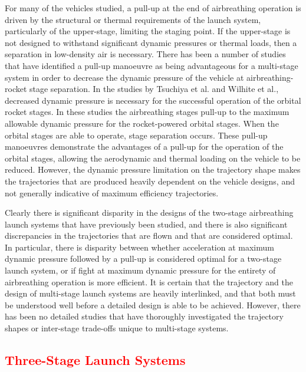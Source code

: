 For many of the vehicles studied, a pull-up at the end of airbreathing operation is driven by the structural or thermal requirements of the launch system, particularly of the upper-stage, limiting the staging point. If the upper-stage is not designed to withstand significant dynamic pressures or thermal loads, then a separation in low-density air is necessary. 
There has been a number of studies that have identified a pull-up manoeuvre as being advantageous for a multi-stage system in order to decrease the dynamic pressure of the vehicle at airbreathing-rocket stage separation\cite{Tsuchiya2005,Wilhite1991,Mehta2001,XXX}. 
In the studies by Tsuchiya et al.\cite{Tsuchiya2005} and Wilhite et al.\cite{Wilhite1991}, decreased dynamic pressure is necessary for the successful operation of the orbital rocket stages. In these studies the airbreathing stages pull-up to the maximum allowable dynamic pressure for the rocket-powered orbital stages. When the orbital stages are able to operate, stage separation occurs. These pull-up manoeuvres demonstrate the advantages of a pull-up for the operation of the orbital stages, allowing the aerodynamic and thermal loading on the vehicle to be reduced. However, the dynamic pressure limitation on the trajectory shape makes the trajectories that are produced heavily dependent on the vehicle designs, and not generally indicative of maximum efficiency trajectories. 



Clearly there is significant disparity in the designs of the two-stage airbreathing launch systems that have previously been studied, and there is also significant discrepancies in the trajectories that are flown and that are considered optimal.
In particular, there is disparity between whether acceleration at maximum dynamic pressure followed by a pull-up is considered optimal for a two-stage launch system, or if fight at maximum dynamic pressure for the entirety of airbreathing operation is more efficient.
It is certain that the trajectory and the design of multi-stage launch systems are heavily interlinked, and that both must be understood well before a detailed design is able to be achieved. However, there has been no detailed studies that have thoroughly investigated the trajectory shapes or inter-stage trade-offs unique to multi-stage systems. 



  \textcolor{red}{
  \subsection{Three-Stage Launch Systems}\label{sec:threestage}
}
	
